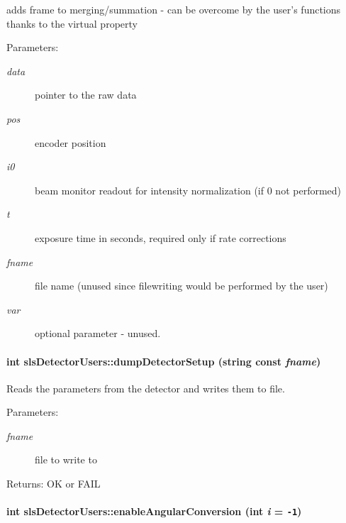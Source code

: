 adds frame to merging/summation - can be overcome by the user's functions thanks to the virtual property 

\begin{Desc}
\item[Parameters:]
\begin{description}
\item[{\em data}]pointer to the raw data \item[{\em pos}]encoder position \item[{\em i0}]beam monitor readout for intensity normalization (if 0 not performed) \item[{\em t}]exposure time in seconds, required only if rate corrections \item[{\em fname}]file name (unused since filewriting would be performed by the user) \item[{\em var}]optional parameter - unused. \end{description}
\end{Desc}
\hypertarget{classslsDetectorUsers_d6b968f4d520342324762c496ebeb481}{
\paragraph[dumpDetectorSetup]{\setlength{\rightskip}{0pt plus 5cm}int sls\-Detector\-Users::dump\-Detector\-Setup (string const  {\em fname})}\hfill}
\label{classslsDetectorUsers_d6b968f4d520342324762c496ebeb481}


Reads the parameters from the detector and writes them to file. 

\begin{Desc}
\item[Parameters:]
\begin{description}
\item[{\em fname}]file to write to \end{description}
\end{Desc}
\begin{Desc}
\item[Returns:]OK or FAIL \end{Desc}
\hypertarget{classslsDetectorUsers_51f92b69e05e8ee2e0c547ec4a6e97da}{
\paragraph[enableAngularConversion]{\setlength{\rightskip}{0pt plus 5cm}int sls\-Detector\-Users::enable\-Angular\-Conversion (int {\em i} = {\tt -1})}\hfill}
\label{classslsDetectorUsers_51f92b69e05e8ee2e0c547ec4a6e97da}


